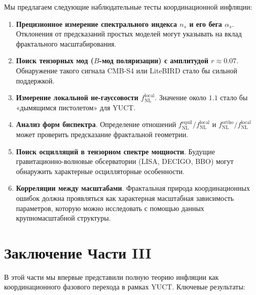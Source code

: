 \documentclass[11pt,a4paper]{article}
\begin{document}
	Мы предлагаем следующие наблюдательные тесты координационной инфляции:
	
	\begin{enumerate}
		\item \textbf{Прецизионное измерение спектрального индекса \(n_s\) и его бега \(\alpha_s\)}. Отклонения от предсказаний простых моделей могут указывать на вклад фрактального масштабирования.
		\item \textbf{Поиск тензорных мод (\(B\)-мод поляризации) с амплитудой \(r \approx 0.07\)}. Обнаружение такого сигнала CMB‑S4 или LiteBIRD стало бы сильной поддержкой.
		\item \textbf{Измерение локальной не-гауссовости \(f_{\text{NL}}^{\text{local}}\)}. Значение около \(1.1\) стало бы «дымящимся пистолетом» для YUCT.
		\item \textbf{Анализ форм биспектра}. Определение отношений \(f_{\text{NL}}^{\text{equil}}/f_{\text{NL}}^{\text{local}}\) и \(f_{\text{NL}}^{\text{ortho}}/f_{\text{NL}}^{\text{local}}\) может проверить предсказание фрактальной геометрии.
		\item \textbf{Поиск осцилляций в тензорном спектре мощности}. Будущие гравитационно-волновые обсерватории (LISA, DECIGO, BBO) могут обнаружить характерные осцилляторные особенности.
		\item \textbf{Корреляции между масштабами}. Фрактальная природа координационных ошибок должна проявляться как характерная масштабная зависимость параметров, которую можно исследовать с помощью данных крупномасштабной структуры.
	\end{enumerate}
	
	\section{Заключение Части III}
	\label{sec:conclusion-inflation}
	
	В этой части мы впервые представили полную теорию инфляции как координационного фазового перехода в рамках YUCT. Ключевые результаты:
	
\end{document}
